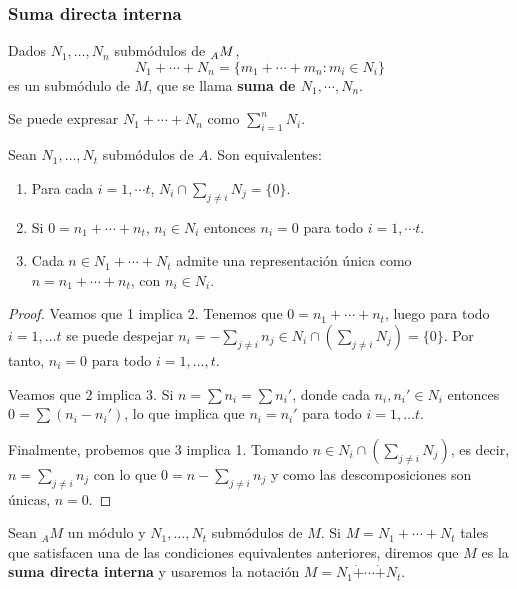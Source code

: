\subsubsection{Suma directa interna}

\begin{df}
  Dados \(N_1,\ldots, N_n\) submódulos de \(\prescript{}{A}{M}\),
  \[
    N_1+\cdots+ N_n=\{m_1+\cdots+m_n: m_i\in N_i\}
  \]
  es un submódulo de \(M\), que se llama \textbf{suma de \(N_1, \cdots, N_n\)}.
\end{df}

\begin{nt}
  Se puede expresar \(N_1+\cdots+ N_n\) como \(\sum_{i=1}^n N_i\).
\end{nt}

\begin{prop}\label{prop:suma-interna}
  Sean \(N_1,\ldots, N_t\) submódulos de \(A\). Son equivalentes:
  \begin{enumerate}
    \item Para cada \(i = 1, \cdots t\), \(N_i\cap\sum_{j\neq i}N_j =\{0\}\).
    \item Si \(0=n_1+\cdots+n_t\), \(n_i\in N_i\) entonces \(n_i=0\)
      para todo \(i = 1, \cdots t\).
    \item Cada \(n\in N_1+\cdots+N_t\) admite una representación
      única como \(n=n_1+\cdots+n_t\), con \(n_i\in N_i\).
  \end{enumerate}
\end{prop}
\begin{proof}
  Veamos que 1 implica 2. Tenemos que \(0=n_1+\cdots+n_t\), luego para todo
  \(i = 1, \ldots t\) se puede despejar \(n_i=-\sum_{j\neq i} n_j\in N_i\cap\left(
    \sum_{j\neq i} N_j\right)=\{0\}\). Por tanto, \(n_i = 0\) para todo \(i = 1, \ldots,
  t\).

  Veamos que 2 implica 3. Si \(n=\sum n_i=\sum n_i'\), donde cada \(n_i, n_i' \in N_i\)
  entonces \(0=\sum(n_i-n_i')\), lo que implica que
  \(n_i=n_i'\) para todo \(i = 1, \ldots t\).
 
  Finalmente, probemos que 3 implica 1. Tomando \(n \in N_i\cap\left(
  \sum_{j\neq i} N_j\right)\), es decir,
  \(n=\sum_{j\neq i}n_j\) con lo que
  \(0=n-\sum_{j\neq i} n_j\) y como las descomposiciones
  son únicas, \(n=0\).
\end{proof}

\begin{df}
  Sean \({}_AM\) un módulo y \(N_1, \ldots, N_t\) submódulos de \(M\). Si
  \(M=N_1+\cdots+ N_t\) tales que satisfacen una de las condiciones
  equivalentes anteriores, diremos que \(M\) es la \textbf{suma directa interna}
  y usaremos la notación \(M=N_1\dot{+}\cdots\dot{+} N_t\).
\end{df}

